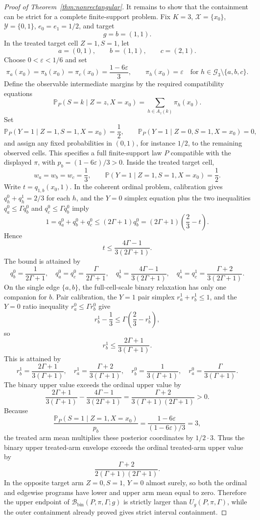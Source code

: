 \documentclass[11pt]{article}
\renewcommand{\Pr}{\mathbb{P}}
\theoremstyle{definition}
\theoremstyle{plain}
\theoremstyle{remark}
\begin{document}
\begin{proof}[Proof of Theorem~\ref{thm:nonrectangular}]
It remains to show that the containment can be strict for a complete
finite-support problem.  Fix \(K=3\), \(\mathcal X=\{x_0\}\),
\(\mathcal Y=\{0,1\}\), \(e_0=e_1=1/2\), and target
\[
  g=b=(1,1).
\]
In the treated target cell \(Z=1,S=1\), let
\[
  a=(0,1),\qquad b=(1,1),\qquad c=(2,1).
\]
Choose \(0<\varepsilon<1/6\) and set
\[
  \pi_a(x_0)=\pi_b(x_0)=\pi_c(x_0)=\frac{1-6\varepsilon}{3},
  \qquad
  \pi_h(x_0)=\varepsilon
  \quad
  \text{for }h\in\mathcal G_3\setminus\{a,b,c\}.
\]
Define the observable intermediate margins by the required compatibility
equations
\[
  \Pr_P(S=k\mid Z=z,X=x_0)=\sum_{h\in A_z(k)}\pi_h(x_0).
\]
Set
\[
  \Pr_P(Y=1\mid Z=1,S=1,X=x_0)=\frac12,
  \qquad
  \Pr_P(Y=1\mid Z=0,S=1,X=x_0)=0,
\]
and assign any fixed probabilities in \((0,1)\), for instance \(1/2\), to the
remaining observed cells.  This specifies a full finite-support law \(P\)
compatible with the displayed \(\pi\), with \(p_b=(1-6\varepsilon)/3>0\).
Inside the treated target cell,
\[
  w_a=w_b=w_c=\frac13,\qquad
  \Pr(Y=1\mid Z=1,S=1,X=x_0)=\frac12.
\]
Write \(t=q_{1,b}(x_0,1)\).  In the coherent ordinal problem, calibration gives
\(q_h^0+q_h^1=2/3\) for each \(h\), and the \(Y=0\) simplex equation plus the
two inequalities \(q_a^0\le\Gamma q_b^0\) and
\(q_c^0\le\Gamma q_b^0\) imply
\[
  1=q_a^0+q_b^0+q_c^0
  \le
  (2\Gamma+1)q_b^0
  =
  (2\Gamma+1)\left(\frac23-t\right).
\]
Hence
\[
  t\le
  \frac{4\Gamma-1}{3(2\Gamma+1)}.
\]
The bound is attained by
\[
  q_b^0=\frac{1}{2\Gamma+1},\quad
  q_a^0=q_c^0=\frac{\Gamma}{2\Gamma+1},\quad
  q_b^1=\frac{4\Gamma-1}{3(2\Gamma+1)},\quad
  q_a^1=q_c^1=\frac{\Gamma+2}{3(2\Gamma+1)}.
\]
On the single edge \(\{a,b\}\), the full-cell-scale binary relaxation has only
one companion for \(b\).  Pair calibration, the \(Y=1\) pair simplex
\(r_a^1+r_b^1\le1\), and the \(Y=0\) ratio inequality
\(r_a^0\le\Gamma r_b^0\) give
\[
  r_b^1-\frac13\le \Gamma\left(\frac23-r_b^1\right),
\]
so
\[
  r_b^1\le
  \frac{2\Gamma+1}{3(\Gamma+1)}.
\]
This is attained by
\[
  r_b^1=\frac{2\Gamma+1}{3(\Gamma+1)},\quad
  r_a^1=\frac{\Gamma+2}{3(\Gamma+1)},\quad
  r_b^0=\frac{1}{3(\Gamma+1)},\quad
  r_a^0=\frac{\Gamma}{3(\Gamma+1)}.
\]
The binary upper value exceeds the ordinal upper value by
\[
  \frac{2\Gamma+1}{3(\Gamma+1)}
  -
  \frac{4\Gamma-1}{3(2\Gamma+1)}
  =
  \frac{\Gamma+2}{3(\Gamma+1)(2\Gamma+1)}
  >0.
\]
Because
\[
  \frac{\Pr_P(S=1\mid Z=1,X=x_0)}{p_b}=\frac{1-6\varepsilon}{(1-6\varepsilon)/3}
  =3,
\]
the treated arm mean multiplies these posterior coordinates by \(1/2\cdot3\).
Thus the binary upper treated-arm envelope exceeds the ordinal treated-arm
upper value by
\[
  \frac{\Gamma+2}{2(\Gamma+1)(2\Gamma+1)}.
\]
In the opposite target arm \(Z=0,S=1\), \(Y=0\) almost surely, so both the
ordinal and edgewise programs have lower and upper arm mean equal to zero.
Therefore the upper endpoint of
\(\mathcal B_{\mathrm{bin}}(P,\pi,\Gamma;g)\) is strictly larger than
\(U_g(P,\pi,\Gamma)\), while the outer containment already proved gives
strict interval containment.


\end{proof}
\end{document}
